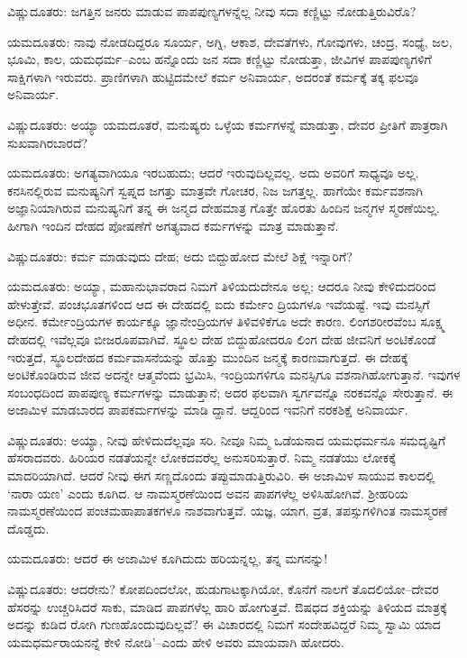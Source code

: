 ವಿಷ್ಣುದೂತರು: ಜಗತ್ತಿನ ಜನರು ಮಾಡುವ ಪಾಪಪುಣ್ಯಗಳನ್ನೆಲ್ಲ ನೀವು ಸದಾ ಕಣ್ಣಿಟ್ಟು ನೋಡುತ್ತಿರುವಿರೊ?

ಯಮದೂತರು: ನಾವು ನೋಡದಿದ್ದರೂ ಸೂರ್ಯ, ಅಗ್ನಿ, ಆಕಾಶ, ದೇವತೆಗಳು, ಗೋವುಗಳು, ಚಂದ್ರ, ಸಂಧ್ಯೆ, ಜಲ, ಭೂಮಿ, ಕಾಲ, ಯಮಧರ್ಮ–ಎಂಬ ಹನ್ನೊಂದು ಜನ ಸದಾ ಕಣ್ಣಿಟ್ಟು ನೋಡುತ್ತಾ, ಜೀವಿಗಳ ಪಾಪಪುಣ್ಯಗಳಿಗೆ ಸಾಕ್ಷಿಗಳಾಗಿ ಇರುವರು. ಪ್ರಾಣಿಗಳಾಗಿ ಹುಟ್ಟಿದಮೇಲೆ ಕರ್ಮ ಅನಿವಾರ್ಯ, ಅದರಂತೆ ಕರ್ಮಕ್ಕೆ ತಕ್ಕ ಫಲವೂ ಅನಿವಾರ್ಯ.

ವಿಷ್ಣುದೂತರು: ಅಯ್ಯಾ ಯಮದೂತರೆ, ಮನುಷ್ಯರು ಒಳ್ಳೆಯ ಕರ್ಮಗಳನ್ನೆ ಮಾಡುತ್ತಾ, ದೇವರ ಪ್ರೀತಿಗೆ ಪಾತ್ರರಾಗಿ ಸುಖವಾಗಿರಬಾರದೆ?

ಯಮದೂತರು: ಅಗತ್ಯವಾಗಿಯೂ ಇರಬಹುದು; ಆದರೆ ಇರುವುದಿಲ್ಲವಲ್ಲ. ಅದು ಅವರಿಗೆ ಸಾಧ್ಯವೂ ಅಲ್ಲ. ಕನಸಿನಲ್ಲಿರುವ ಮನುಷ್ಯನಿಗೆ ಸ್ವಪ್ನದ ಜಗತ್ತು ಮಾತ್ರವೇ ಗೋಚರ, ನಿಜ ಜಗತ್ತಲ್ಲ. ಹಾಗೆಯೇ ಕರ್ಮವಶನಾಗಿ ಅಜ್ಞಾನಿಯಾಗಿರುವ ಮನುಷ್ಯನಿಗೆ ತನ್ನ ಈ ಜನ್ಮದ ದೇಹಮಾತ್ರ ಗೊತ್ತೇ ಹೊರತು ಹಿಂದಿನ ಜನ್ಮಗಳ ಸ್ಮರಣೆಯಿಲ್ಲ. ಹೀಗಾಗಿ ಇಂದಿನ ದೇಹದ ಪೋಷಣೆಗೆ ಅಗತ್ಯವಾದ ಕರ್ಮಗಳನ್ನು ಮಾತ್ರ ಮಾಡುತ್ತಾನೆ.

ವಿಷ್ಣುದೂತರು: ಕರ್ಮ ಮಾಡುವುದು ದೇಹ; ಅದು ಬಿದ್ದುಹೋದ ಮೇಲೆ ಶಿಕ್ಷೆ ಇನ್ನಾರಿಗೆ?

ಯಮದೂತರು: ಅಯ್ಯಾ, ಮಹಾನುಭಾವರಾದ ನಿಮಗೆ ತಿಳಿಯದುದೇನೂ ಅಲ್ಲ; ಆದರೂ ನೀವು ಕೇಳಿದುದರಿಂದ ಹೇಳುತ್ತೇವೆ. ಪಂಚಭೂತಗಳಿಂದ ಆದ ಈ ದೇಹದಲ್ಲಿ ಐದು ಕರ್ಮೇಂ ದ್ರಿಯಗಳೂ ಇವೆಯಷ್ಟೆ. ಇವು ಮನಸ್ಸಿಗೆ ಅಧೀನ. ಕರ್ಮೇಂದ್ರಿಯಗಳ ಕಾರ್ಯಕ್ಕೂ ಜ್ಞಾನೇಂದ್ರಿಯಗಳ ತಿಳಿವಳಿಕೆಗೂ ಅದೇ ಕಾರಣ. ಲಿಂಗಶರೀರವೆಂಬ ಸೂಕ್ಷ್ಮ ದೇಹದಲ್ಲಿ ಇವೆಲ್ಲವೂ ಬೀಜರೂಪವಾಗಿವೆ. ಸ್ಥೂಲ ದೇಹ ಬಿದ್ದುಹೋದರೂ ಲಿಂಗ ದೇಹ ಜೀವನಿಗೆ ಅಂಟಿಕೊಂಡೆ ಇರುತ್ತದೆ, ಸ್ಥೂಲದೇಹದ ಕರ್ಮವಾಸನೆಯನ್ನು ಹೊತ್ತು ಮುಂದಿನ ಜನ್ಮಕ್ಕೆ ಕಾರಣವಾಗುತ್ತದೆ. ಈ ದೇಹಕ್ಕೆ ಅಂಟಿಕೊಂಡಿರುವ ಜೀವ ಅದನ್ನೇ ಆತ್ಮವೆಂದು ಭ್ರಮಿಸಿ, ಇಂದ್ರಿಯಗಳಿಗೂ ಮನಸ್ಸಿಗೂ ವಶನಾಗಿಹೋಗುತ್ತಾನೆ. ಇವುಗಳ ಸಂಬಂಧದಿಂದ ಪಾಪಪುಣ್ಯ ಕರ್ಮಗಳನ್ನು ಮಾಡುತ್ತಾನೆ; ಅದರ ಫಲವಾಗಿ ಸ್ವರ್ಗವನ್ನೊ ನರಕವನ್ನೊ ಸೇರುತ್ತಾನೆ. ಈ ಅಜಾಮಿಳ ಮಾಡಬಾರದ ಪಾಪಕರ್ಮಗಳನ್ನು ಮಾಡಿ ದ್ದಾನೆ. ಆದ್ದರಿಂದ ಇವನಿಗೆ ನರಕಶಿಕ್ಷೆ ಅನಿವಾರ್ಯ. 

ವಿಷ್ಣುದೂತರು: ಅಯ್ಯಾ, ನೀವು ಹೇಳಿದುದೆಲ್ಲವೂ ಸರಿ. ನೀವೂ ನಿಮ್ಮ ಒಡೆಯನಾದ ಯಮಧರ್ಮನೂ ಸಮದೃಷ್ಟಿಗೆ ಹೆಸರಾದವರು. ಹಿರಿಯರ ನಡತೆಯನ್ನೇ ಲೋಕದವರೆಲ್ಲ ಅನುಸರಿಸುತ್ತಾರೆ. ನಿಮ್ಮ ನಡತೆಯು ಲೋಕಕ್ಕೆ ಮಾದರಿಯಾಗಿದೆ. ಆದರೆ ನೀವು ಈಗ ಸಣ್ಣದೊಂದು ತಪ್ಪುಮಾಡುತ್ತಿರುವಿರಿ. ಈ ಅಜಾಮಿಳ ಸಾಯುವ ಕಾಲದಲ್ಲಿ ‘ನಾರಾ ಯಣ’ ಎಂದು ಕೂಗಿದ. ಆ ನಾಮಸ್ಮರಣೆಯಿಂದ ಅವನ ಪಾಪಗಳೆಲ್ಲ ಅಳಿಸಿಹೋಗಿವೆ. ಶ್ರೀಹರಿಯ ನಾಮಸ್ಮರಣೆಯಿಂದ ಪಂಚಮಹಾಪಾತಕಗಳೂ ನಾಶವಾಗುತ್ತವೆ. ಯಜ್ಞ, ಯಾಗ, ವ್ರತ, ತಪಸ್ಸುಗಳಿಗಿಂತ ನಾಮಸ್ಮರಣೆ ದೊಡ್ಡದು.

ಯಮದೂತರು: ಆದರೆ ಈ ಅಜಾಮಿಳ ಕೂಗಿದುದು ಹರಿಯನ್ನಲ್ಲ, ತನ್ನ ಮಗನನ್ನು!

ವಿಷ್ಣುದೂತರು: ಆದರೇನು? ಕೋಪದಿಂದಲೋ, ಹುಡುಗಾಟಕ್ಕಾಗಿಯೋ, ಕೊನೆಗೆ ನಾಲಗೆ ತೊದಲಿಯೋ–ದೇವರ ಹೆಸರನ್ನು ಉಚ್ಚರಿಸಿದರೆ ಸಾಕು, ಮಾಡಿದ ಪಾಪಗಳೆಲ್ಲ ಹಾರಿ ಹೋಗುತ್ತವೆ. ಔಷಧದ ಶಕ್ತಿಯನ್ನು ತಿಳಿಯದ ಮಾತ್ರಕ್ಕೆ ಅದನ್ನು ಕುಡಿದ ರೋಗಿ ಗುಣಹೊಂದುವುದಿಲ್ಲವೆ? ಈ ವಿಚಾರದಲ್ಲಿ ನಿಮಗೆ ಸಂದೇಹವಿದ್ದರೆ ನಿಮ್ಮ ಸ್ವಾಮಿ ಯಾದ ಯಮಧರ್ಮರಾಯನನ್ನೆ ಕೇಳಿ ನೋಡಿ’–ಎಂದು ಹೇಳಿ ಅವರು ಮಾಯವಾಗಿ ಹೋದರು.

